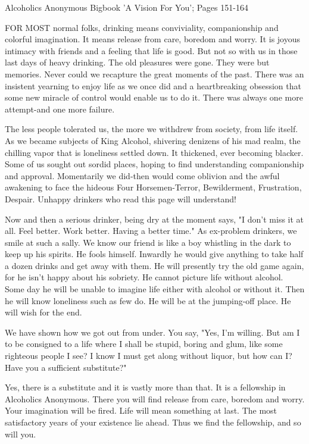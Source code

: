 
Alcoholics Anonymous Bigbook 'A Vision For You'; Pages 151-164

\begin{biblechapter}
FOR MOST normal folks, drinking means conviviality, companionship and colorful imagination.  It means release from care, boredom and worry.  It is joyous intimacy with friends and a feeling that life is good.  But not so with us in those last days of heavy drinking.  The old pleasures were gone.  They were but memories.  Never could we recapture the great moments of the past.  There was an insistent yearning to enjoy life as we once did and a heartbreaking obsession that some new miracle of control would enable us to do it.  There was always one more attempt-and one more failure.

The less people tolerated us, the more we withdrew from society, from life itself.  As we became subjects of King Alcohol, shivering denizens of his mad realm, the chilling vapor that is loneliness settled down.  It thickened, ever becoming blacker.  Some of us sought out sordid places, hoping to find understanding companionship and approval.  Momentarily we did-then would come oblivion and the awful awakening to face the hideous Four Horsemen-Terror, Bewilderment, Frustration, Despair.  Unhappy drinkers who read this page will understand!

Now and then a serious drinker, being dry at the moment says, "I don't miss it at all.  Feel better.  Work better.  Having a better time."  As ex-problem drinkers, we smile at such a sally.  We know our friend is like a boy whistling in the dark to keep up his spirits.  He fools himself.  Inwardly he would give anything to take half a dozen drinks and get away with them.  He will presently try the old game again, for he isn't happy about his sobriety.  He cannot picture life without alcohol.  Some day he will be unable to imagine life either with alcohol or without it.  Then he will know loneliness such as few do.  He will be at the jumping-off place.  He will wish for the end.

We have shown how we got out from under.  You say, "Yes, I'm willing.  But am I to be consigned to a life where I shall be stupid, boring and glum, like some righteous people I see?  I know I must get along without liquor, but how can I?  Have you a sufficient substitute?"

Yes, there is a substitute and it is vastly more than that.  It is a fellowship in Alcoholics Anonymous.  There you will find release from care, boredom and worry.  Your imagination will be fired.  Life will mean something at last.  The most satisfactory years of your existence lie ahead.  Thus we find the fellowship, and so will you.


\end{biblechapter}
